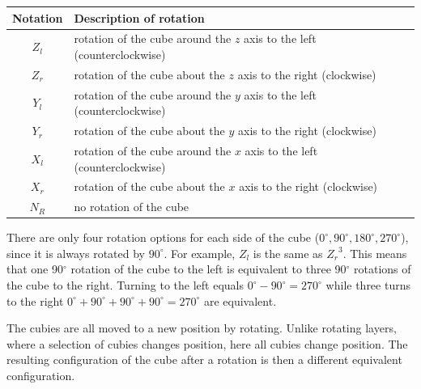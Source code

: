 \documentclass[12pt,a4paper]{article}
\theoremstyle{custom}
\begin{document}
\vspace*{1em}
\begin{adjustbox}{width=1\textwidth,center}
\begin{tabular}{cl}
\toprule
\textbf{Notation} & \textbf{Description of rotation} \\
\midrule
$Z_l$ & rotation of the cube around the $z$ axis to the left (counterclockwise)\\

$Z_r$ & rotation of the cube about the $z$ axis to the right (clockwise) \\

$Y_l$ & rotation of the cube around the $y$ axis to the left (counterclockwise)\\

$Y_r$ & rotation of the cube about the $y$ axis to the right (clockwise) \\

$X_l$ & rotation of the cube around the $x$ axis to the left (counterclockwise)\\

$X_r$ & rotation of the cube about the $x$ axis to the right (clockwise) \\

$N_R$ & no rotation of the cube \\
\bottomrule
\end{tabular}
\end{adjustbox}

\vspace{0.5cm}
 There are only four rotation options for each side of the cube ($0^\circ, 90^\circ, 180^\circ, 270^\circ$), since it is always rotated by $90^\circ$. For example, $Z_l$ is the same as ${Z_r}^3$. This means that one 90$^\circ$ rotation of the cube to the left is equivalent to three 90$^\circ$ rotations of the cube to the right. Turning to the left equals $0^\circ-90^\circ = 270^\circ$ while three turns to the right $0^\circ+90^\circ+90^\circ+90^\circ=270^\circ$ are equivalent.

The cubies are all moved to a new position by rotating. Unlike rotating layers, where a selection of cubies changes position, here all cubies change position. The resulting configuration of the cube after a rotation is then a different equivalent configuration.
\end{document}
